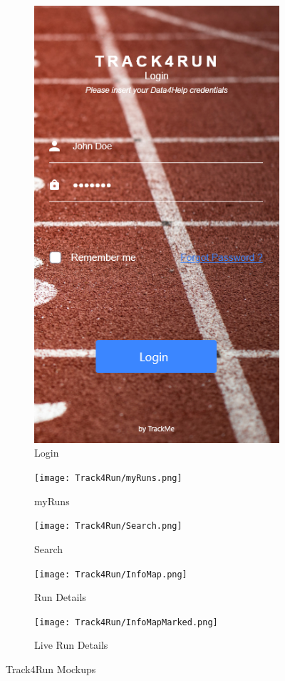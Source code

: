 \begin{figure}[!ht]
  \centering
  \begin{subfigure}[b]{0.4\linewidth}
    \includegraphics[width=\linewidth]{Mockups/Track4Run/Login.png}
    \caption{Login}
  \end{subfigure}\hfill
  \begin{subfigure}[b]{0.4\linewidth}
    \texttt{[image: Track4Run/myRuns.png]}
    \caption{myRuns}
  \end{subfigure}
  \par\bigskip
  \begin{subfigure}[b]{0.3\linewidth}
    \texttt{[image: Track4Run/Search.png]}
    \caption{Search}
  \end{subfigure}\hfill
  \begin{subfigure}[b]{0.3\linewidth}
    \texttt{[image: Track4Run/InfoMap.png]}
    \caption{Run Details}
  \end{subfigure}\hfill
  \begin{subfigure}[b]{0.3\linewidth}
    \texttt{[image: Track4Run/InfoMapMarked.png]}
    \caption{Live Run Details}
  \end{subfigure}
  \caption{Track4Run Mockups}
\end{figure}